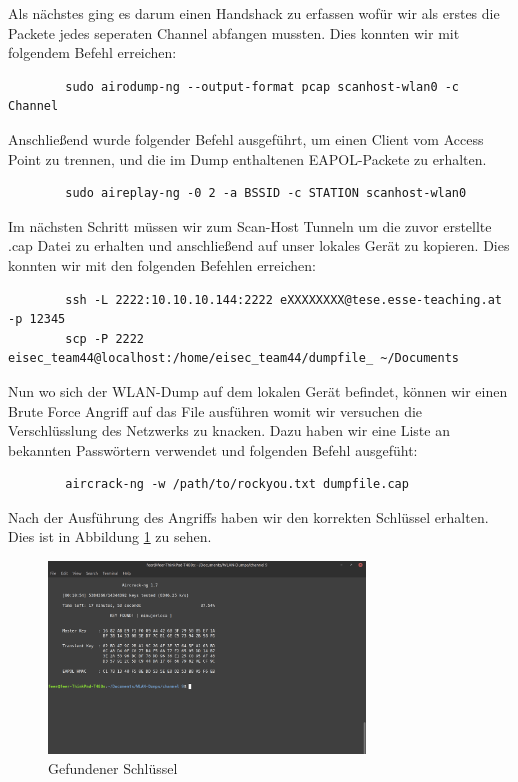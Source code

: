 \documentclass[12pt, a4paper, titlepage, oneside]{scrartcl}
\begin{document}
	Als nächstes ging es darum einen Handshack zu erfassen wofür wir als erstes die Packete jedes seperaten Channel abfangen mussten. Dies konnten wir mit folgendem Befehl erreichen:

	\begin{lstlisting}
		sudo airodump-ng --output-format pcap scanhost-wlan0 -c Channel
	\end{lstlisting}

	Anschließend wurde folgender Befehl ausgeführt, um einen Client vom Access Point zu trennen, und die im Dump enthaltenen EAPOL-Packete zu erhalten.

	\begin{lstlisting}
		sudo aireplay-ng -0 2 -a BSSID -c STATION scanhost-wlan0
	\end{lstlisting}

	Im nächsten Schritt müssen wir zum Scan-Host Tunneln um die zuvor erstellte .cap Datei zu erhalten und anschließend auf unser lokales Gerät zu kopieren. Dies konnten wir mit den folgenden Befehlen erreichen:

	\begin{lstlisting}
		ssh -L 2222:10.10.10.144:2222 eXXXXXXXX@tese.esse-teaching.at -p 12345
		scp -P 2222 eisec_team44@localhost:/home/eisec_team44/dumpfile_ ~/Documents
	\end{lstlisting}

	Nun wo sich der WLAN-Dump auf dem lokalen Gerät befindet, können wir einen Brute Force Angriff auf das File ausführen womit wir versuchen die Verschlüsslung des Netzwerks zu knacken. Dazu haben wir eine Liste an bekannten Passwörtern verwendet und folgenden Befehl ausgefüht:

	\begin{lstlisting}
		aircrack-ng -w /path/to/rockyou.txt dumpfile.cap
	\end{lstlisting}

	Nach der Ausführung des Angriffs haben wir den korrekten Schlüssel erhalten. Dies ist in Abbildung \ref{fig:schluesselGefunden} zu sehen.

	\begin{figure}[h]
		\centering
		\includegraphics[width=0.75\textwidth]{imgs/Wireless Time Travel/schluesselGefunden.png}
		\caption{Gefundener Schlüssel}
		\label{fig:schluesselGefunden}
	\end{figure}
\end{document}
